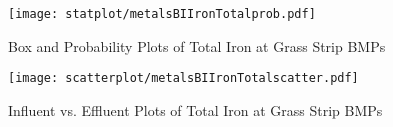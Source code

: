         \begin{figure}[hb]   %
            \centering
            \texttt{[image: statplot/metalsBIIronTotalprob.pdf]}
            \caption{Box and Probability Plots of Total Iron at Grass Strip BMPs}
        \end{figure}         %
        
        
        \begin{figure}[hb]   %
            \centering
            \texttt{[image: scatterplot/metalsBIIronTotalscatter.pdf]}
            \caption{Influent vs. Effluent Plots of Total Iron at Grass Strip BMPs}
        \end{figure}         %
        \clearpage
        